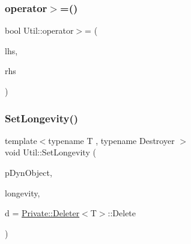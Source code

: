 \mbox{\label{namespaceUtil_afc603e9af4a3169c07212d563c33862c}} 
\subsubsection{\texorpdfstring{operator$>$=()}{operator>=()}}
{\footnotesize\ttfamily bool Util\+::operator$>$= (\begin{DoxyParamCaption}\item[{const \mbox{\hyperlink{classUtil_1_1TypeInfo}{Type\+Info}} \&}]{lhs,  }\item[{const \mbox{\hyperlink{classUtil_1_1TypeInfo}{Type\+Info}} \&}]{rhs }\end{DoxyParamCaption})\hspace{0.3cm}{\ttfamily [inline]}}

\mbox{\label{namespaceUtil_a3883209db7bb694594e3cbde04febb5d}} 
\subsubsection{\texorpdfstring{SetLongevity()}{SetLongevity()}}
{\footnotesize\ttfamily template$<$typename T , typename Destroyer $>$ \\
void Util\+::\+Set\+Longevity (\begin{DoxyParamCaption}\item[{T $\ast$}]{p\+Dyn\+Object,  }\item[{unsigned int}]{longevity,  }\item[{Destroyer}]{d = {\ttfamily \mbox{\hyperlink{structUtil_1_1Private_1_1Deleter}{Private\+::\+Deleter}}$<$T$>$\+:\+:Delete} }\end{DoxyParamCaption})}

